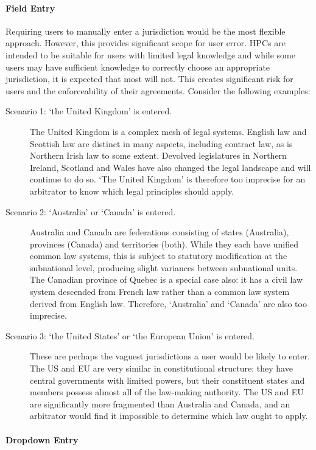 \documentclass[a4paper,12pt]{article}
\begin{document}
\paragraph{Field Entry}

Requiring users to manually enter a jurisdiction would be the most flexible approach. However, this provides significant scope for user error. HPCs are intended to be suitable for users with limited legal knowledge and while some users may have sufficient knowledge to correctly choose an appropriate jurisdiction, it is expected that most will not. This creates significant risk for users and the enforceability of their agreements. Consider the following examples:

\begin{description}
	\item[Scenario 1: `the United Kingdom' is entered.] The United Kingdom is a complex mesh of legal systems. English law and Scottish law are distinct in many aspects, including contract law, as is Northern Irish law to some extent. Devolved legislatures in Northern Ireland, Scotland and Wales have also changed the legal landscape and will continue to do so. `The United Kingdom' is therefore too imprecise for an arbitrator to know which legal principles should apply.
	\item[Scenario 2: `Australia' or `Canada' is entered.] Australia and Canada are federations consisting of states (Australia), provinces (Canada) and territories (both). While they each have unified common law systems, this is subject to statutory modification at the subnational level, producing slight variances between subnational units. The Canadian province of Quebec is a special case also: it has a civil law system descended from French law rather than a common law system derived from English law. Therefore, `Australia' and `Canada' are also too imprecise.
	\item[Scenario 3: `the United States' or `the European Union' is entered.] These are perhaps the vaguest jurisdictions a user would be likely to enter. The US and EU are very similar in constitutional structure: they have central governments with limited powers, but their constituent states and members possess almost all of the law-making authority. The US and EU are significantly more fragmented than Australia and Canada, and an arbitrator would find it impossible to determine which law ought to apply.
\end{description}

\paragraph{Dropdown Entry}
\end{document}
